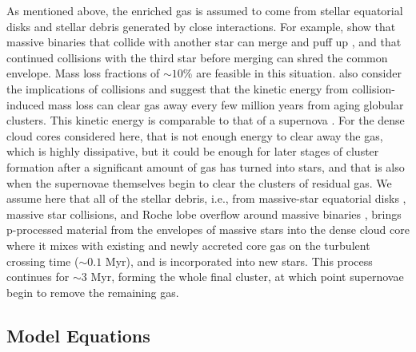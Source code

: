 \documentclass[12pt,preprint]{aastex}
\begin{document}
As mentioned above, the enriched gas is assumed to come from stellar equatorial
disks \citep{prantzos06} and stellar debris generated by close interactions. For
example, \cite{gaburov10} show that massive binaries that collide with another star
can merge and puff up \citep[see also][]{fregeau04}, and that continued collisions
with the third star before merging can shred the common envelope. Mass loss
fractions of $\sim10$\% are feasible in this situation. \cite{umbreit08} also
consider the implications of collisions and suggest that the kinetic energy from
collision-induced mass loss can clear gas away every few million years from aging
globular clusters. This kinetic energy is comparable to that of a supernova
\citep{gaburov10}.  For the dense cloud cores considered here, that is not enough
energy to clear away the gas, which is highly dissipative, but it could be enough
for later stages of cluster formation after a significant amount of gas has turned
into stars, and that is also when the supernovae themselves begin to clear the
clusters of residual gas.  We assume here that all of the stellar debris, i.e.,
from massive-star equatorial disks \citep{prantzos06}, massive star collisions, and
Roche lobe overflow around massive binaries \citep{demink09}, brings p-processed
material from the envelopes of massive stars into the dense cloud core where it
mixes with existing and newly accreted core gas on the turbulent crossing time
($\sim0.1$ Myr), and is incorporated into new stars.  This process continues for
$\sim3$ Myr, forming the whole final cluster, at which point supernovae begin to
remove the remaining gas.


\subsection{Model Equations}
\label{modeleq}
\end{document}
